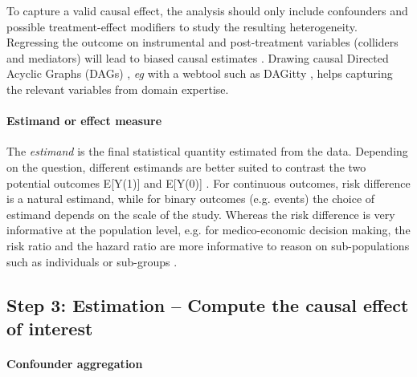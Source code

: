 \documentclass[french,12pt,twoside,a4paper]{book}
\begin{document}
\begin{background_box_left}

  To capture a valid causal effect, the analysis should only include confounders
  and possible treatment-effect modifiers to study the resulting heterogeneity.
  Regressing the outcome on instrumental and post-treatment variables (colliders
  and mediators) will lead to biased causal estimates
  \citep{vanderweele2019principles}. Drawing causal Directed Acyclic Graphs (DAGs)
  \citep{greenland1999causal}, \emph{eg} with a webtool such as DAGitty
  \citep{textor2011dagitty}, helps capturing the relevant variables from domain
  expertise.

  \paragraph{Estimand or effect measure}

  The \emph{estimand} is the final statistical quantity estimated from the data.
  Depending on the question, different estimands are better suited to contrast the
  two potential outcomes E[Y(1)] and E[Y(0)] \citep{imbens_nonparametric_2004,
    colnet2023risk}. For continuous outcomes, risk difference is a natural estimand,
  while for binary outcomes (e.g. events)  the choice of estimand depends on the
  scale of the study. Whereas the risk difference is very informative at the
  population level, e.g. for medico-economic decision making, the risk ratio and
  the hazard ratio are more informative to reason on sub-populations such as
  individuals or sub-groups \citep{colnet2023risk}.

\end{background_box_left}

\subsection{Step 3: Estimation -- Compute the causal effect of interest}\label{subsec:causal_tuto:estimation}

\paragraph{Confounder aggregation}
\end{document}
